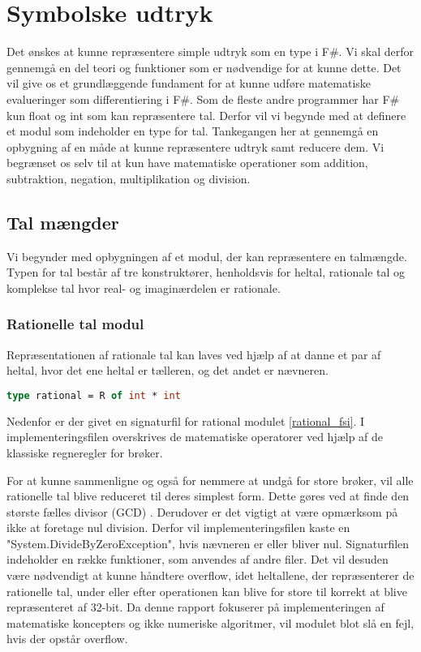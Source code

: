 \section{Symbolske udtryk}
Det ønskes at kunne repræsentere simple udtryk som en type i F\#. Vi skal derfor gennemgå en del teori og funktioner som er nødvendige for at kunne dette. Det vil give os et grundlæggende fundament for at kunne udføre matematiske evalueringer som differentiering i F\#. Som de fleste andre programmer har F\# kun float og int som kan repræsentere tal. Derfor vil vi begynde med at definere et modul som indeholder en type for tal. Tankegangen her at gennemgå en opbygning af en måde at kunne repræsentere udtryk samt reducere dem. Vi begrænset os selv til at kun have matematiske operationer som addition, subtraktion, negation, multiplikation og division.

\subsection{Tal mængder}
Vi begynder med opbygningen af et modul, der kan repræsentere en talmængde. Typen for tal består af tre konstruktører, henholdsvis for heltal, rationale tal og komplekse tal hvor real- og imaginærdelen er rationale. 

\subsubsection{Rationelle tal modul}\label{sec:rational}
Repræsentationen af rationale tal kan laves ved hjælp af at danne et par af heltal, hvor det ene heltal er tælleren, og det andet er nævneren.


\begin{lstlisting}[language={FSharp}, 
    label={type_rationel},
    caption={Typen for rationelle tal}]
type rational = R of int * int
\end{lstlisting}
Nedenfor er der givet en signaturfil for rational modulet \ref{rational_fsi}. I implementeringsfilen overskrives de matematiske operatorer ved hjælp af de klassiske regneregler for brøker.


For at kunne sammenligne og også for nemmere at undgå for store brøker, vil alle rationelle tal blive reduceret til deres simplest form. Dette gøres ved at finde den største fælles divisor (GCD) . Derudover er det vigtigt at være opmærksom på ikke at foretage nul division. Derfor vil implementeringsfilen kaste en "System.DivideByZeroException", hvis nævneren er eller bliver nul. Signaturfilen indeholder en række funktioner, som anvendes af andre filer. Det vil desuden være nødvendigt at kunne håndtere overflow, idet heltallene, der repræsenterer de rationelle tal, under eller efter operationen kan blive for store til korrekt at blive repræsenteret af 32-bit. Da denne rapport fokuserer på implementeringen af matematiske koncepters og ikke numeriske algoritmer, vil modulet blot slå en fejl, hvis der opstår overflow.
 



